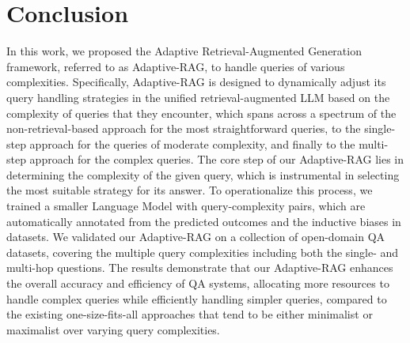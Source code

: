 \section{Conclusion}
In this work, we proposed the Adaptive Retrieval-Augmented Generation framework, referred to as Adaptive-RAG, to handle queries of various complexities. Specifically, Adaptive-RAG is designed to dynamically adjust its query handling strategies in the unified retrieval-augmented LLM based on the complexity of queries that they encounter, which spans across a spectrum of the non-retrieval-based approach for the most straightforward queries, to the single-step approach for the queries of moderate complexity, and finally to the multi-step approach for the complex queries. The core step of our Adaptive-RAG lies in determining the complexity of the given query, which is instrumental in selecting the most suitable strategy for its answer. To operationalize this process, we trained a smaller Language Model with query-complexity pairs, which are automatically annotated from the predicted outcomes and the inductive biases in datasets. We validated our Adaptive-RAG on a collection of open-domain QA datasets, covering the multiple query complexities including both the single- and multi-hop questions. The results demonstrate that our Adaptive-RAG enhances the overall accuracy and efficiency of QA systems, allocating more resources to handle complex queries while efficiently handling simpler queries, compared to the existing one-size-fits-all approaches that tend to be either minimalist or maximalist over varying query complexities.

